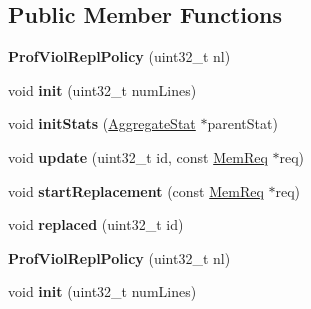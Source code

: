 \subsection*{Public Member Functions}
\begin{DoxyCompactItemize}
\item 
\hypertarget{classProfViolReplPolicy_a2d18c0ce23ac41aec6f6072b346f633c}{{\bfseries Prof\-Viol\-Repl\-Policy} (uint32\-\_\-t nl)}\label{classProfViolReplPolicy_a2d18c0ce23ac41aec6f6072b346f633c}

\item 
\hypertarget{classProfViolReplPolicy_a2ab282d60729a80a3f385e47be4c256b}{void {\bfseries init} (uint32\-\_\-t num\-Lines)}\label{classProfViolReplPolicy_a2ab282d60729a80a3f385e47be4c256b}

\item 
\hypertarget{classProfViolReplPolicy_a386dca240e3305a99b077f9dc6949f04}{void {\bfseries init\-Stats} (\hyperlink{classAggregateStat}{Aggregate\-Stat} $\ast$parent\-Stat)}\label{classProfViolReplPolicy_a386dca240e3305a99b077f9dc6949f04}

\item 
\hypertarget{classProfViolReplPolicy_ab463dd1014ffe813a31216e3a55ba2a9}{void {\bfseries update} (uint32\-\_\-t id, const \hyperlink{structMemReq}{Mem\-Req} $\ast$req)}\label{classProfViolReplPolicy_ab463dd1014ffe813a31216e3a55ba2a9}

\item 
\hypertarget{classProfViolReplPolicy_a7c2e6d39c29c16e37571addbf39e3aaa}{void {\bfseries start\-Replacement} (const \hyperlink{structMemReq}{Mem\-Req} $\ast$req)}\label{classProfViolReplPolicy_a7c2e6d39c29c16e37571addbf39e3aaa}

\item 
\hypertarget{classProfViolReplPolicy_a0dc71739c20a5df5d621a41a07323247}{void {\bfseries replaced} (uint32\-\_\-t id)}\label{classProfViolReplPolicy_a0dc71739c20a5df5d621a41a07323247}

\item 
\hypertarget{classProfViolReplPolicy_a2d18c0ce23ac41aec6f6072b346f633c}{{\bfseries Prof\-Viol\-Repl\-Policy} (uint32\-\_\-t nl)}\label{classProfViolReplPolicy_a2d18c0ce23ac41aec6f6072b346f633c}

\item 
\hypertarget{classProfViolReplPolicy_a2ab282d60729a80a3f385e47be4c256b}{void {\bfseries init} (uint32\-\_\-t num\-Lines)}\label{classProfViolReplPolicy_a2ab282d60729a80a3f385e47be4c256b}


\end{DoxyCompactItemize}
